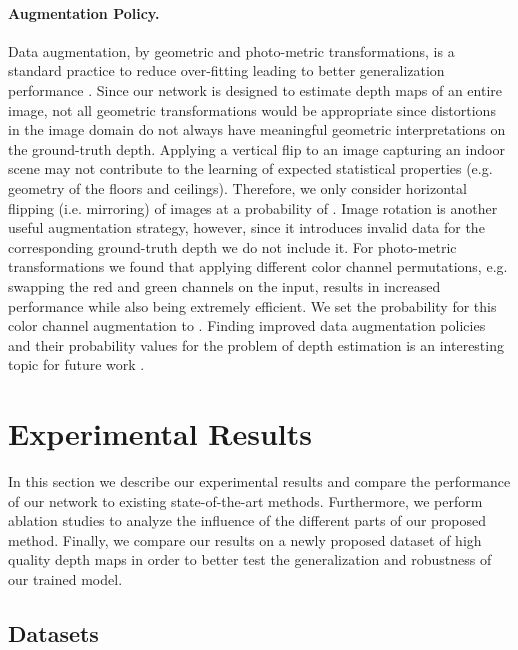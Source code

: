 \documentclass[10pt,twocolumn,letterpaper]{article}
\begin{document}
\paragraph{Augmentation Policy.} Data augmentation, by geometric and photo-metric transformations, is a standard practice to reduce over-fitting leading to better generalization performance \cite{krizhevsky2012imagenet}.
Since our network is designed to estimate depth maps of an entire image, not all geometric transformations would be appropriate since distortions in the image domain do not always have meaningful geometric interpretations on the ground-truth depth. Applying a vertical flip to an image capturing an indoor scene may not contribute to the learning of expected statistical properties (e.g. geometry of the floors and ceilings). Therefore, we only consider horizontal flipping (i.e. mirroring) of images at a probability of . Image rotation is another useful augmentation strategy, however, since it introduces invalid data for the corresponding ground-truth depth we do not include it. 
For photo-metric transformations we found that applying different color channel permutations, e.g. swapping the red and green channels on the input, results in increased performance while also being extremely efficient. We set the probability for this color channel augmentation to . Finding improved data augmentation policies and their probability values for the problem of depth estimation is an interesting topic for future work \cite{Cubuk2018AutoAugmentLA}.










\section{Experimental Results}

In this section we describe our experimental results and compare the performance of our network to existing state-of-the-art methods. Furthermore, we perform ablation studies to analyze the influence of the different parts of our proposed method. Finally, we compare our results on a newly proposed dataset of high quality depth maps in order to better test the generalization and robustness of our trained model.

\subsection{Datasets}
\end{document}
